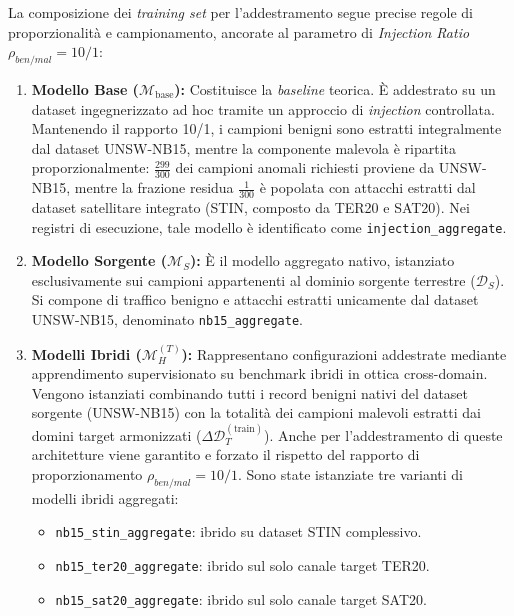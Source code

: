 La composizione dei \textit{training set} per l'addestramento segue precise regole di proporzionalità e campionamento, ancorate al parametro di \textit{Injection Ratio} $\rho_{ben/mal} = 10/1$:
\begin{enumerate}
    \item \textbf{Modello Base ($\mathcal{M}_{\text{base}}$):} Costituisce la \textit{baseline} teorica. 
    È addestrato su un dataset ingegnerizzato ad hoc tramite un approccio di \textit{injection} controllata. 
    Mantenendo il rapporto 10/1, i campioni benigni sono estratti integralmente dal dataset UNSW-NB15, mentre la componente malevola è ripartita proporzionalmente: $\frac{299}{300}$ dei campioni anomali richiesti proviene da UNSW-NB15, mentre la frazione residua $\frac{1}{300}$ è popolata con attacchi estratti dal dataset satellitare integrato (STIN, composto da TER20 e SAT20). 
    Nei registri di esecuzione, tale modello è identificato come \texttt{injection\_aggregate}.
    
    \item \textbf{Modello Sorgente ($\mathcal{M}_S$):} È il modello aggregato nativo, istanziato esclusivamente sui campioni appartenenti al dominio sorgente terrestre ($\mathcal{D}_S$). 
    Si compone di traffico benigno e attacchi estratti unicamente dal dataset UNSW-NB15, denominato \texttt{nb15\_aggregate}.
    
    \item \textbf{Modelli Ibridi ($\mathcal{M}_H^{(T)}$):} Rappresentano configurazioni addestrate mediante apprendimento supervisionato su benchmark ibridi in ottica cross-domain. 
    Vengono istanziati combinando tutti i record benigni nativi del dataset sorgente (UNSW-NB15) con la totalità dei campioni malevoli estratti dai domini target armonizzati ($\Delta\mathcal{D}_T^{(\text{train})}$). 
    Anche per l'addestramento di queste architetture viene garantito e forzato il rispetto del rapporto di proporzionamento $\rho_{ben/mal} = 10/1$. 
    Sono state istanziate tre varianti di modelli ibridi aggregati:
    \begin{itemize}
        \item \texttt{nb15\_stin\_aggregate}: ibrido su dataset STIN complessivo.
        \item \texttt{nb15\_ter20\_aggregate}: ibrido sul solo canale target TER20.
        \item \texttt{nb15\_sat20\_aggregate}: ibrido sul solo canale target SAT20.
    \end{itemize}
\end{enumerate}


